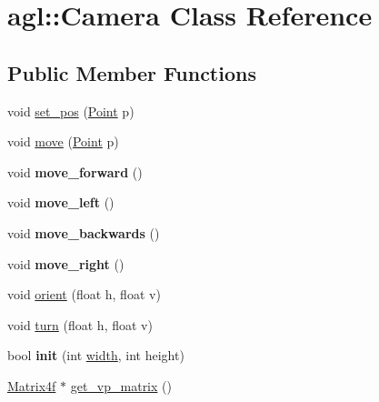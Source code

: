 \hypertarget{classagl_1_1Camera}{}\section{agl\+::Camera Class Reference}
\label{classagl_1_1Camera}
\subsection*{Public Member Functions}
\begin{DoxyCompactItemize}
\item 
void \mbox{\hyperlink{classagl_1_1Camera_a01c4d59b49a9dafddf3110ecf3f2de8c}{set\+\_\+pos}} (\mbox{\hyperlink{classagl_1_1Point}{Point}} p)
\item 
void \mbox{\hyperlink{classagl_1_1Camera_a121e091d9a0f2bbb56080e0cd6774572}{move}} (\mbox{\hyperlink{classagl_1_1Point}{Point}} p)
\item 
\mbox{\label{classagl_1_1Camera_afbc1c0876008bfc68c8cc24076163a3f}} 
void {\bfseries move\+\_\+forward} ()
\item 
\mbox{\label{classagl_1_1Camera_a9dac6c92d770bdc37bce87b58d6c8801}} 
void {\bfseries move\+\_\+left} ()
\item 
\mbox{\label{classagl_1_1Camera_a3ef7af79bc8f6924cc7332d47b31a34f}} 
void {\bfseries move\+\_\+backwards} ()
\item 
\mbox{\label{classagl_1_1Camera_aa4aad202c15420667cf7b0fb244d1984}} 
void {\bfseries move\+\_\+right} ()
\item 
void \mbox{\hyperlink{classagl_1_1Camera_a796d0f35bb9e5b3e7ac418ac5b302584}{orient}} (float h, float v)
\item 
void \mbox{\hyperlink{classagl_1_1Camera_aea8f0343ddc60924b01c918e8be47ac0}{turn}} (float h, float v)
\item 
\mbox{\label{classagl_1_1Camera_a07c878568c33efbbf330e9b5ccc0a72e}} 
bool {\bfseries init} (int \mbox{\hyperlink{classagl_1_1Camera_ab7f25faffd597eb3557e9a41bed2a99f}{width}}, int height)
\item 
\mbox{\hyperlink{classagl_1_1Matrix4f}{Matrix4f}} $\ast$ \mbox{\hyperlink{classagl_1_1Camera_aabf49dbe9c14189dad0a2f55a0c404cb}{get\+\_\+vp\+\_\+matrix}} ()
\end{DoxyCompactItemize}
